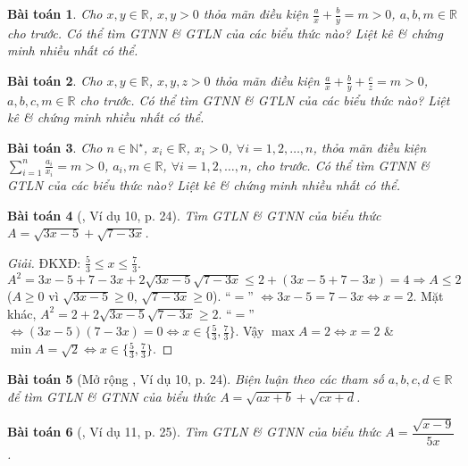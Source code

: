 \documentclass{article}
\newtheorem{baitoan}{Bài toán}
\begin{document}
\begin{baitoan}
	Cho $x,y\in\mathbb{R}$, $x,y > 0$ thỏa mãn điều kiện $\frac{a}{x} + \frac{b}{y} = m > 0$, $a,b,m\in\mathbb{R}$ cho trước. Có thể tìm {\rm GTNN} \& {\rm GTLN} của các biểu thức nào? Liệt kê \& chứng minh nhiều nhất có thể.
\end{baitoan}

\begin{baitoan}
	Cho $x,y\in\mathbb{R}$, $x,y,z > 0$ thỏa mãn điều kiện $\frac{a}{x} + \frac{b}{y} + \frac{c}{z} = m > 0$, $a,b,c,m\in\mathbb{R}$ cho trước. Có thể tìm {\rm GTNN} \& {\rm GTLN} của các biểu thức nào? Liệt kê \& chứng minh nhiều nhất có thể.
\end{baitoan}

\begin{baitoan}
	Cho $n\in\mathbb{N}^\star$, $x_i\in\mathbb{R}$, $x_i > 0$, $\forall i = 1,2,\ldots,n$, thỏa mãn điều kiện $\sum_{i=1}^n \frac{a_i}{x_i} = m > 0$, $a_i,m\in\mathbb{R}$, $\forall i = 1,2,\ldots,n$, cho trước. Có thể tìm {\rm GTNN} \& {\rm GTLN} của các biểu thức nào? Liệt kê \& chứng minh nhiều nhất có thể.
\end{baitoan}

\begin{baitoan}[\cite{Tuyen_Toan_9}, Ví dụ 10, p. 24]
	Tìm {\rm GTLN} \& {\rm GTNN} của biểu thức $A = \sqrt{3x - 5} + \sqrt{7 - 3x}$.
\end{baitoan}

\begin{proof}[Giải]
	ĐKXĐ: $\frac{5}{3}\le x\le\frac{7}{3}$. $A^2 = 3x - 5 + 7 - 3x + 2\sqrt{3x - 5}\sqrt{7 - 3x}\le2 + (3x - 5 + 7 - 3x) = 4\Rightarrow A\le2$ ($A\ge0$ vì $\sqrt{3x - 5}\ge0$, $\sqrt{7 - 3x}\ge0$). ``$=$'' $\Leftrightarrow 3x - 5 = 7 - 3x\Leftrightarrow x = 2$. Mặt khác, $A^2 = 2 + 2\sqrt{3x - 5}\sqrt{7 - 3x}\ge2$. ``$=$'' $\Leftrightarrow(3x - 5)(7 - 3x) = 0\Leftrightarrow x\in\{\frac{5}{3},\frac{7}{3}\}$. Vậy $\max A = 2\Leftrightarrow x = 2$ \& $\min A = \sqrt{2}\Leftrightarrow x\in\{\frac{5}{3},\frac{7}{3}\}$.
\end{proof}

\begin{baitoan}[Mở rộng \cite{Tuyen_Toan_9}, Ví dụ 10, p. 24]
	Biện luận theo các tham số $a,b,c,d\in\mathbb{R}$ để tìm {\rm GTLN} \& {\rm GTNN} của biểu thức $A = \sqrt{ax + b} + \sqrt{cx + d}$.
\end{baitoan}

\begin{baitoan}[\cite{Tuyen_Toan_9}, Ví dụ 11, p. 25]
	Tìm {\rm GTLN} \& {\rm GTNN} của biểu thức $A = \dfrac{\sqrt{x - 9}}{5x}$.
\end{baitoan}
\end{document}
